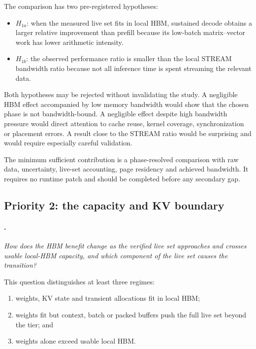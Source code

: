 The comparison has two pre-registered hypotheses:

\begin{itemize}
  \item \(H_{1a}\): when the measured live set fits in local HBM,
        sustained decode obtains a larger relative improvement than
        prefill because its low-batch matrix--vector work has lower
        arithmetic intensity.
  \item \(H_{1b}\): the observed performance ratio is smaller than the
        local STREAM bandwidth ratio because not all inference time is
        spent streaming the relevant data.
\end{itemize}

Both hypotheses may be rejected without invalidating the study.  A
negligible HBM effect accompanied by low memory bandwidth would show
that the chosen phase is not bandwidth-bound.  A negligible effect
despite high bandwidth pressure would direct attention to cache reuse,
kernel coverage, synchronization or placement errors.  A result close
to the STREAM ratio would be surprising and would require especially
careful validation.

The minimum sufficient contribution is a phase-resolved comparison with
raw data, uncertainty, live-set accounting, page residency and achieved
bandwidth.  It requires no runtime patch and should be completed before
any secondary gap.

\subsection{Priority 2: the capacity and KV boundary}
\label{sec:gap-capacity}

\paragraph{.}
\emph{How does the HBM benefit change as the verified live set
approaches and crosses usable local-HBM capacity, and which component
of the live set causes the transition?}

This question distinguishes at least three regimes:

\begin{enumerate}
  \item weights, KV state and transient allocations fit in local HBM;
  \item weights fit but context, batch or packed buffers push the full
        live set beyond the tier; and
  \item weights alone exceed usable local HBM.
\end{enumerate}

